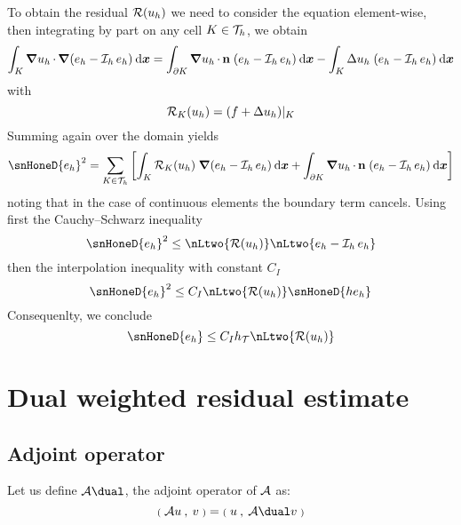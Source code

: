 To obtain the residual ${\mathcal{R}({u_h})}$ we need to consider the equation element-wise, then integrating by part on any cell $K \in {\mathcal T}_h$, we obtain
\begin{equation*}
\int_K {\boldsymbol\nabla} {u_h} \,{\mathbf\cdot}\, {\boldsymbol\nabla} (e_h - \mathop{\mathcal{I}_{h}} e_h) \hspace{.5ex}{\mathrm d}{\boldsymbol x} = \int_{\partial K} {\boldsymbol\nabla} {u_h} \,{\mathbf\cdot}\, \mathbf n\;(e_h - \mathop{\mathcal{I}_{h}} e_h) \hspace{.5ex}{\mathrm d}{\boldsymbol x} - \int_K \Delta {u_h} \; (e_h - \mathop{\mathcal{I}_{h}} e_h) \hspace{.5ex}{\mathrm d}{\boldsymbol x}
\end{equation*}
with
\begin{equation*}
{\mathcal{R}_K({u_h})} = (f + \Delta {u_h})\rvert_K
\end{equation*}
Summing again over the domain yields
\begin{equation*}
\snHoneD{e_h}^2 = \sum _{K\in\meshT}\left[\int_K \ResK{\uh}\; \Grad (e_h - \Iop{h} e_h) \dxx + \int_{\partial K} \Grad \uh \xDot \n\;(e_h - \Iop{h} e_h) \dxx \right]
\end{equation*}
noting that in the case of continuous elements the boundary term cancels.
Using first the Cauchy--Schwarz inequality
\begin{equation*}
\snHoneD{e_h}^2 \leq \nLtwo{\Res{\uh}} \nLtwo{e_h - \Iop{h} e_h}
\end{equation*}
then the interpolation inequality with constant $C_I$
\begin{equation*}
\snHoneD{e_h}^2 \leq C_I \nLtwo{\Res{\uh}} \snHoneD{h e_h}
\end{equation*}
Consequenlty, we conclude
\begin{equation*}
\snHoneD{e_h} \leq C_I \sizeT \nLtwo{\Res{\uh}}
\end{equation*}

\section{Dual weighted residual estimate}

\subsection{Adjoint operator}

\begin{dfntn}
Let us define $\opA\dual$, the adjoint operator of $\mathcal{A}$ as:
\begin{equation*}
\Inner{\opA u}{v} = \Inner{u}{\opA\dual v}
\end{equation*}
\end{dfntn}

